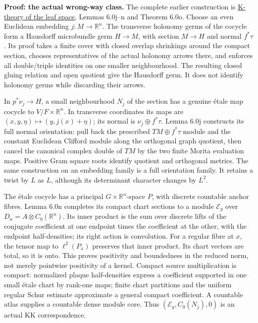 \documentclass[
  11pt,
]{article}
\begin{document}
\textbf{Proof: the actual wrong-way class.} The complete earlier
construction is
\href{../NCG-FOLIATIONS/k-theory-of-the-leaf-space.html\#section-6}{K-theory
of the leaf space}, Lemmas 6.0j--n and Theorem 6.0o. Choose an even
Euclidean embedding \(j:M\to\mathbb R^n\). The transverse holonomy germs
of the cocycle form a Hausdorff microbundle germ \(H\to M\), with
section \(M\to H\) and normal \(f^*\tau\). Its proof takes a finite
cover with closed overlap shrinkings around the compact section, chooses
representatives of the actual holonomy arrows there, and enforces all
double/triple identities on one smaller neighbourhood. The resulting
closed gluing relation and open quotient give the Hausdorff germ. It
does not identify holonomy germs while discarding their arrows.

In \(p^*\nu_j\to H\), a small neighbourhood \(N_j\) of the section has a
genuine étale map cocycle to \(V/F\times\mathbb R^n\). In transverse
coordinates its maps are \((x,y,\eta)\mapsto(y,j(x)+\eta)\); its normal
is \(\nu_j\oplus f^*\tau\). Lemma 6.0j constructs its full normal
orientation: pull back the prescribed \(TM\oplus f^*\tau\) module and
the constant Euclidean Clifford module along the orthogonal graph
quotient, then cancel the canonical complex double of \(TM\) by the two
finite Morita evaluation maps. Positive Gram square roots identify
quotient and orthogonal metrics. The same construction on an embedding
family is a full orientation family. It retains a twist by \(L\) as
\(L\), although its determinant character changes by \(L^2\).

The étale cocycle has a principal \(G\times\mathbb R^n\)-space \(P\),
with discrete countable anchor fibres. Lemma 6.0n completes its compact
chart sections to a module \(\mathcal E_g\) over
\(D_n=A\otimes C_0(\mathbb R^n)\). Its inner product is the sum over
discrete lifts of the conjugate coefficient at one endpoint times the
coefficient at the other, with the endpoint half-densities; its right
action is convolution. For a regular fibre at \(x\), the tensor map to
\(\ell^2(P_x)\) preserves that inner product. Its chart vectors are
total, so it is onto. This proves positivity and boundedness in the
reduced norm, not merely pointwise positivity of a kernel. Compact
source multiplication is compact: normalized plaque half-densities
express a coefficient supported in one small étale chart by rank-one
maps; finite chart partitions and the uniform regular Schur estimate
approximate a general compact coefficient. A countable atlas supplies a
countable dense module core. Thus \((\mathcal E_g,C_0(N_j),0)\) is an
actual KK correspondence.
\end{document}

